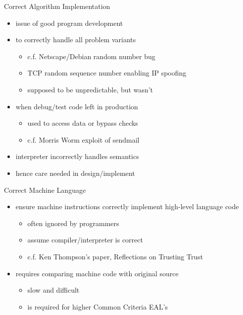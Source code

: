 \documentclass{beamer}
\begin{document}
\begin{frame}{Correct Algorithm Implementation}
  \begin{itemize}
  \item issue of good program development
  \item to correctly handle all problem variants
  \begin{itemize}
    \item c.f. Netscape/Debian random number bug
    \item TCP random sequence number enabling IP spoofing
    \item supposed to be unpredictable, but wasn’t
  \end{itemize}
  \item when debug/test code left in production
  \begin{itemize}
    \item used to access data or bypass checks
    \item c.f. Morris Worm exploit of sendmail
  \end{itemize}
  \item interpreter incorrectly handles semantics
  \item hence care needed in design/implement 
  \end{itemize}
\end{frame}

\begin{frame}{Correct Machine Language}
  \begin{itemize}
  \item ensure machine instructions correctly
    implement high-level language code
  \begin{itemize}
    \item often ignored by programmers
    \item assume compiler/interpreter is correct
    \item c.f. Ken Thompson’s paper, Reflections on Trusting Trust
  \end{itemize}
  \item requires comparing machine code with original
source
  \begin{itemize}
    \item slow and difficult
    \item is required for higher Common Criteria EAL’s
  \end{itemize}
  \end{itemize}
\end{frame}
\end{document}
